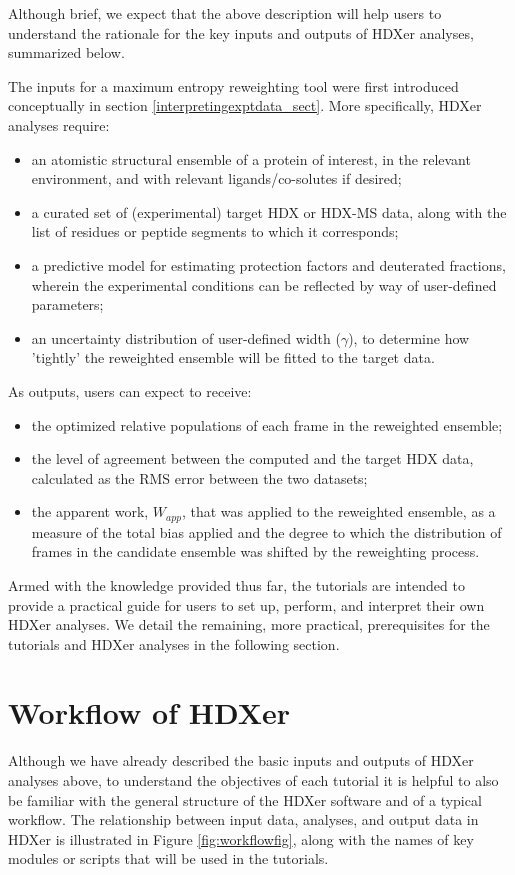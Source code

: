 \documentclass[9pt,tutorial]{livecoms}
\begin{document}
Although brief, we expect that the above description will help users to understand the rationale for the key inputs and outputs of HDXer analyses, summarized below.

The inputs for a maximum entropy reweighting tool were first introduced conceptually in section \ref{interpretingexptdata_sect}. More specifically, HDXer analyses require:
\begin{itemize}
    \item an atomistic structural ensemble of a protein of interest, in the relevant environment, and with relevant ligands/co-solutes if desired;
    \item a curated set of (experimental) target HDX or HDX-MS data, along with the list of residues or peptide segments to which it corresponds;
    \item a predictive model for estimating protection factors and deuterated fractions, wherein the experimental conditions can be reflected by way of user-defined parameters;
    \item an uncertainty distribution of user-defined width ($\gamma$), to determine how 'tightly' the reweighted ensemble will be fitted to the target data.
\end{itemize}
As outputs, users can expect to receive:
\begin{itemize}
    \item the optimized relative populations of each frame in the reweighted ensemble;
    \item the level of agreement between the computed and the target HDX data, calculated as the RMS error between the two datasets;
    \item the apparent work, $W_{app}$, that was applied to the reweighted ensemble, as a measure of the total bias applied and the degree to which the distribution of frames in the candidate ensemble was shifted by the reweighting process.
\end{itemize}
Armed with the knowledge provided thus far, the tutorials are intended to provide a practical guide for users to set up, perform, and interpret their own HDXer analyses.
We detail the remaining, more practical, prerequisites for the tutorials and HDXer analyses in the following section.

\section{Workflow of HDXer}
Although we have already described the basic inputs and outputs of HDXer analyses above, to understand the objectives of each tutorial it is helpful to also be familiar with the general structure of the HDXer software and of a typical workflow.
The relationship between input data, analyses, and output data in HDXer is illustrated in Figure \ref{fig:workflowfig}, along with the names of key modules or scripts that will be used in the tutorials.
\end{document}
